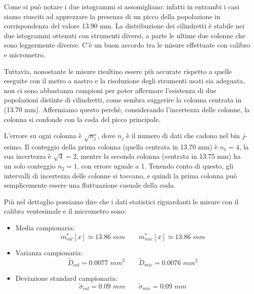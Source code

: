 Come si può notare i due istogrammi si assomigliano: infatti in entrambi i casi
siamo riusciti ad apprezzare la presenza di un picco della popolazione in
corrispondenza del valore 13.90 mm. La distribuzione dei cilindretti è stabile
nei due istogrammi ottenuti con strumenti diversi, a parte le ultime due colonne
che sono leggermente diverse. C'è un buon accordo tra le misure effettuate con
calibro e micrometro.

Tuttavia, nonostante le misure risultino essere
più accurate rispetto a quelle eseguite con il metro a nastro e la risoluzione
degli strumenti usati sia adeguata, non ci sono abbastanza campioni per poter affermare
l'esistenza di due popolazioni distinte di cilindretti, come sembra suggerire la colonna
centrata in (13.70 mm). Affermiamo questo perchè, considerando l'incertezza delle colonne,
la colonna si confonde con la coda del picco principale.

L'errore su ogni colonna è $\sqrt{n_j}$, dove $n_j$ è il numero di dati che cadono nel
bin $j$-esimo. Il conteggio della prima colonna (quella centrata in 13.70 mm) è $n_1 = 4$,
la sua incertezza è $\sqrt{4} = 2$, mentre la seconda colonna (centrata in 13.75 mm) ha un
solo conteggio $n_2 = 1$, con errore uguale a 1. Tenendo conto di questo, gli intervalli
di incertezza delle colonne si toccano, e quindi la prima colonna può semplicemente essere
una fluttuazione casuale della coda.

Più nel dettaglio possiamo dire che i dati statistici riguardanti le misure con il calibro
ventesimale e il micrometro sono:

\begin{itemize}
    \item{Media campionaria:}
        \begin{equation*}
        m^*_{cal}[x] \simeq 13.86\,\,mm \qquad
        m^*_{mic}[x] \simeq 13.86\,\,mm 
        \end{equation*}

    \item{Varianza campionaria:}
        \begin{equation*}
        \tilde{D}_{cal} = 0.0077\,\,mm^2 \qquad
        \tilde{D}_{mic} = 0.0076\,\,mm^2
        \end{equation*}

    \item{Deviazione standard campionaria:}
        \begin{equation*}
        \tilde{\sigma}_{cal} = 0.09\,\,mm \qquad
        \tilde{\sigma}_{mic} = 0.09\,\,mm
        \end{equation*}
\end{itemize}

